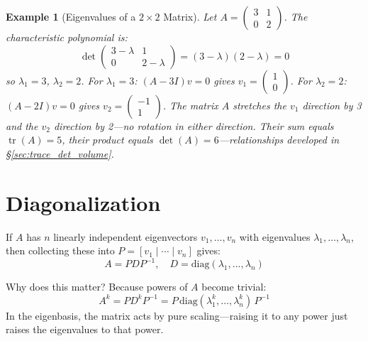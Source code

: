 \documentclass[12pt,a4paper]{report}
\DeclareMathOperator{\tr}{tr}
\theoremstyle{thms}
\theoremstyle{defns}
\newtheorem{example}{Example}[section]
\begin{document}
\begin{example}[Eigenvalues of a $2 \times 2$ Matrix]
    Let $A = \begin{pmatrix} 3 & 1 \\ 0 & 2 \end{pmatrix}$. The characteristic polynomial is:
    \begin{equation}
        \det\begin{pmatrix} 3 - \lambda & 1 \\ 0 & 2 - \lambda \end{pmatrix} = (3 - \lambda)(2 - \lambda) = 0
    \end{equation}
    so $\lambda_1 = 3$, $\lambda_2 = 2$. For $\lambda_1 = 3$: $(A - 3I)v = 0$ gives $v_1 = \begin{pmatrix} 1 \\ 0 \end{pmatrix}$. For $\lambda_2 = 2$: $(A - 2I)v = 0$ gives $v_2 = \begin{pmatrix} -1 \\ 1 \end{pmatrix}$. The matrix $A$ stretches the $v_1$ direction by 3 and the $v_2$ direction by 2—no rotation in either direction. Their sum equals $\tr(A) = 5$, their product equals $\det(A) = 6$—relationships developed in \S\ref{sec:trace_det_volume}.
\end{example}

\section{Diagonalization}
\label{sec:diagonalization_intro}

If $A$ has $n$ linearly independent eigenvectors $v_1, \ldots, v_n$ with eigenvalues $\lambda_1, \ldots, \lambda_n$, then collecting these into $P = [v_1 \mid \cdots \mid v_n]$ gives:
\begin{equation}
    A = PDP^{-1}, \quad D = \mathrm{diag}(\lambda_1, \ldots, \lambda_n)
    \label{eq:diag_general}
\end{equation}

Why does this matter? Because powers of $A$ become trivial:
\begin{equation}
    A^k = PD^kP^{-1} = P\,\mathrm{diag}(\lambda_1^k, \ldots, \lambda_n^k)\,P^{-1}
\end{equation}
In the eigenbasis, the matrix acts by pure scaling—raising it to any power just raises the eigenvalues to that power.
\end{document}
